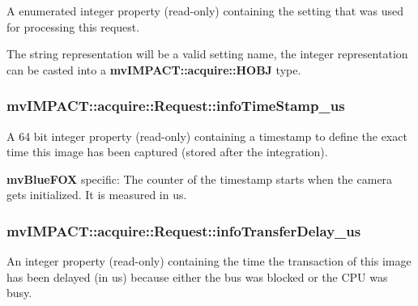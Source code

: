 A enumerated integer property {\bfseries }(read-\/only) containing the setting that was used for processing this request. 

The string representation will be a valid setting name, the integer representation can be casted into a {\bfseries mv\+I\+M\+P\+A\+C\+T\+::acquire\+::\+H\+O\+B\+J} type. \hypertarget{classmv_i_m_p_a_c_t_1_1acquire_1_1_request_ac26005e19f53dc564e3c3763a1fccaee}{
\subsubsection[{info\+Time\+Stamp\+\_\+us}]{ mv\+I\+M\+P\+A\+C\+T\+::acquire\+::\+Request\+::info\+Time\+Stamp\+\_\+us}}\label{classmv_i_m_p_a_c_t_1_1acquire_1_1_request_ac26005e19f53dc564e3c3763a1fccaee}


A 64 bit integer property {\bfseries }(read-\/only) containing a timestamp to define the exact time this image has been captured (stored after the integration). 

{\bfseries mv\+Blue\+F\+O\+X} specific\+: The counter of the timestamp starts when the camera gets initialized. It is measured in us. \hypertarget{classmv_i_m_p_a_c_t_1_1acquire_1_1_request_a6e57b8102fcc2bed76459ed24c09f6cf}{
\subsubsection[{info\+Transfer\+Delay\+\_\+us}]{ mv\+I\+M\+P\+A\+C\+T\+::acquire\+::\+Request\+::info\+Transfer\+Delay\+\_\+us}}\label{classmv_i_m_p_a_c_t_1_1acquire_1_1_request_a6e57b8102fcc2bed76459ed24c09f6cf}


An integer property {\bfseries }(read-\/only) containing the time the transaction of this image has been delayed (in us) because either the bus was blocked or the C\+P\+U was busy. 

